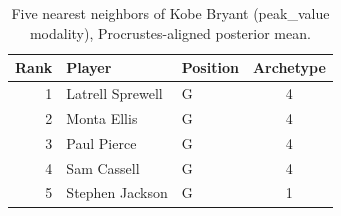 \begin{table}[htbp]
  \centering\small
  \begin{tabular}{rllc}
    \toprule
    Rank & Player & Position & Archetype \\
    \midrule
    1 & Latrell Sprewell & G & 4 \\
    2 & Monta Ellis & G & 4 \\
    3 & Paul Pierce & G & 4 \\
    4 & Sam Cassell & G & 4 \\
    5 & Stephen Jackson & G & 1 \\
    \bottomrule
  \end{tabular}
  \caption{Five nearest neighbors of Kobe Bryant (peak_value modality), Procrustes-aligned posterior mean.}
  \label{tab:Kobe_Bryant_neighbors_peak_value}
\end{table}

